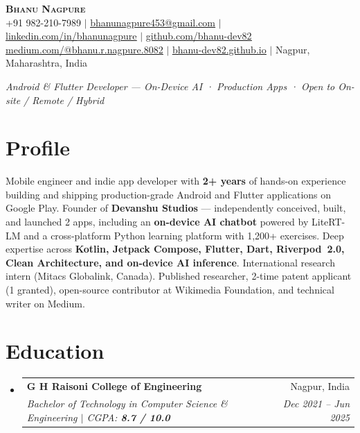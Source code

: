 \documentclass[letterpaper,11pt]{article}
\makeatletter
\newcommand{\resumeSubheading}[4]{
  \vspace{-1pt}\item
    \begin{tabular*}{0.97\textwidth}[t]{l@{\extracolsep{\fill}}r}
      \textbf{#1} & \small #2 \\
      \textit{\small #3} & \textit{\small #4} \\
    \end{tabular*}\vspace{-5pt}
}
\newcommand{\resumeSubHeadingListStart}{
  \begin{itemize}[leftmargin=0.13in, label={}, itemsep=2pt, parsep=0pt]
}
\newcommand{\resumeSubHeadingListEnd}{\end{itemize}}
\makeatother
\begin{document}
\begin{center}
    {\Huge\bfseries\scshape Bhanu Nagpure} \\[5pt]
    \small
    +91 982-210-7989 \;$|$\;
    \href{mailto:bhanunagpure453@gmail.com}{\underline{bhanunagpure453@gmail.com}} \;$|$\;
    \href{https://www.linkedin.com/in/bhanunagpure/}{\underline{linkedin.com/in/bhanunagpure}} \;$|$\;
    \href{https://github.com/bhanu-dev82}{\underline{github.com/bhanu-dev82}}
    \\[2pt]
    \href{https://medium.com/@bhanu.r.nagpure.8082}{\underline{medium.com/@bhanu.r.nagpure.8082}} \;$|$\;
    \href{https://bhanu-dev82.github.io}{\underline{bhanu-dev82.github.io}} \;$|$\;
    Nagpur, Maharashtra, India
\end{center}

\vspace{2pt}
\begin{center}
  \small\textit{Android \& Flutter Developer — On-Device AI · Production Apps · Open to On-site / Remote / Hybrid}
\end{center}

\vspace{4pt}

\section{Profile}

\small{Mobile engineer and indie app developer with \textbf{2+ years} of hands-on experience building and shipping production-grade Android and Flutter applications on Google Play. Founder of \textbf{Devanshu Studios} — independently conceived, built, and launched 2 apps, including an \textbf{on-device AI chatbot} powered by LiteRT-LM and a cross-platform Python learning platform with 1,200+ exercises. Deep expertise across \textbf{Kotlin, Jetpack Compose, Flutter, Dart, Riverpod~2.0, Clean Architecture, and on-device AI inference}. International research intern (Mitacs Globalink, Canada). Published researcher, 2-time patent applicant (1 granted), open-source contributor at Wikimedia Foundation, and technical writer on Medium.}

\section{Education}

\resumeSubHeadingListStart
  \resumeSubheading
    {G H Raisoni College of Engineering}{Nagpur, India}
    {Bachelor of Technology in Computer Science \& Engineering \;$|$\; CGPA: \textbf{8.7 / 10.0}}{Dec 2021 -- Jun 2025}
\resumeSubHeadingListEnd
\end{document}
